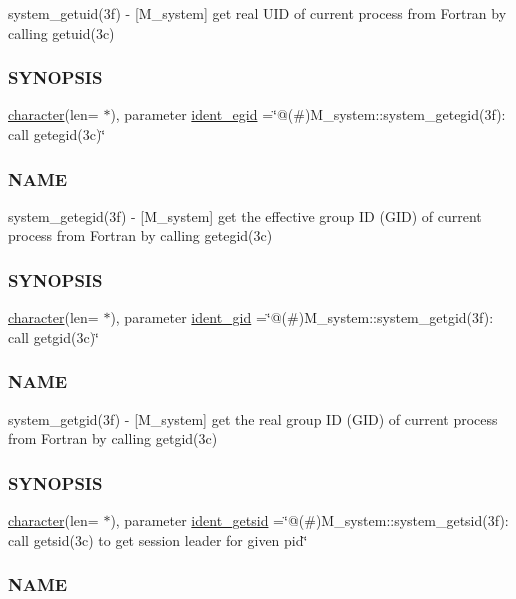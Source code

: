 \begin{DoxyCompactItemize}
\begin{DoxyCompactList}
system\+\_\+getuid(3f) -\/ \mbox{[}M\+\_\+system\mbox{]} get real U\+ID of current process from Fortran by calling getuid(3c) \subsubsection*{S\+Y\+N\+O\+P\+S\+IS}\end{DoxyCompactList}\item 
\hyperlink{option__stopwatch_83_8txt_abd4b21fbbd175834027b5224bfe97e66}{character}(len= $\ast$), parameter \hyperlink{namespacem__system_ad016bff246da00ba4d615fd68345d120}{ident\+\_\+egid} =\char`\"{}@(\#)M\+\_\+system\+::system\+\_\+getegid(3f)\+: call getegid(3c)\char`\"{}
\begin{DoxyCompactList}\small\item\em \subsubsection*{N\+A\+ME}

system\+\_\+getegid(3f) -\/ \mbox{[}M\+\_\+system\mbox{]} get the effective group ID (G\+ID) of current process from Fortran by calling getegid(3c) \subsubsection*{S\+Y\+N\+O\+P\+S\+IS}\end{DoxyCompactList}\item 
\hyperlink{option__stopwatch_83_8txt_abd4b21fbbd175834027b5224bfe97e66}{character}(len= $\ast$), parameter \hyperlink{namespacem__system_aef12712abc21ae9a60c24a59dc6dcb8c}{ident\+\_\+gid} =\char`\"{}@(\#)M\+\_\+system\+::system\+\_\+getgid(3f)\+: call getgid(3c)\char`\"{}
\begin{DoxyCompactList}\small\item\em \subsubsection*{N\+A\+ME}

system\+\_\+getgid(3f) -\/ \mbox{[}M\+\_\+system\mbox{]} get the real group ID (G\+ID) of current process from Fortran by calling getgid(3c) \subsubsection*{S\+Y\+N\+O\+P\+S\+IS}\end{DoxyCompactList}\item 
\hyperlink{option__stopwatch_83_8txt_abd4b21fbbd175834027b5224bfe97e66}{character}(len= $\ast$), parameter \hyperlink{namespacem__system_a16a71dfbcb5290eef064fa7f628018bb}{ident\+\_\+getsid} =\char`\"{}@(\#)M\+\_\+system\+::system\+\_\+getsid(3f)\+: call getsid(3c) to get session leader for given pid\char`\"{}
\begin{DoxyCompactList}\small\item\em \subsubsection*{N\+A\+ME}


\end{DoxyCompactList}
\end{DoxyCompactItemize}
